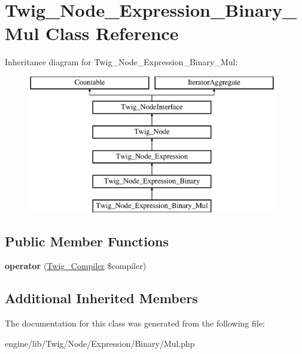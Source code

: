 \hypertarget{class_twig___node___expression___binary___mul}{}\section{Twig\+\_\+\+Node\+\_\+\+Expression\+\_\+\+Binary\+\_\+\+Mul Class Reference}
\label{class_twig___node___expression___binary___mul}
Inheritance diagram for Twig\+\_\+\+Node\+\_\+\+Expression\+\_\+\+Binary\+\_\+\+Mul\+:\begin{figure}[H]
\begin{center}
\leavevmode
\includegraphics[height=6.000000cm]{class_twig___node___expression___binary___mul}
\end{center}
\end{figure}
\subsection*{Public Member Functions}
\begin{DoxyCompactItemize}
\item 
\hypertarget{class_twig___node___expression___binary___mul_af77318ec88d5f8a508684970a150b670}{}{\bfseries operator} (\hyperlink{class_twig___compiler}{Twig\+\_\+\+Compiler} \$compiler)\label{class_twig___node___expression___binary___mul_af77318ec88d5f8a508684970a150b670}

\end{DoxyCompactItemize}
\subsection*{Additional Inherited Members}


The documentation for this class was generated from the following file\+:\begin{DoxyCompactItemize}
\item 
engine/lib/\+Twig/\+Node/\+Expression/\+Binary/Mul.\+php\end{DoxyCompactItemize}
